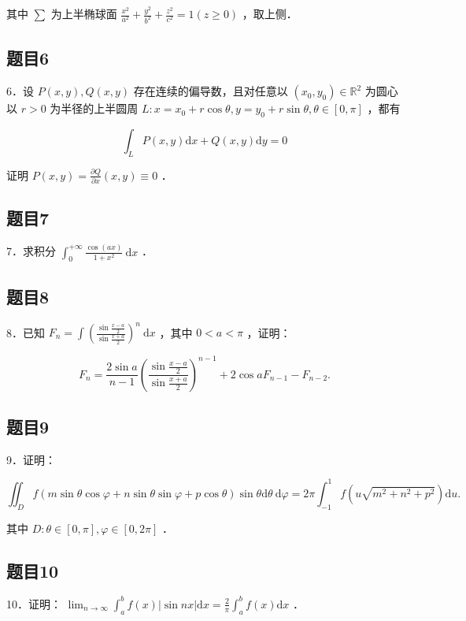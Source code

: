 \documentclass{article}
\begin{document}
其中 \(\sum\) 为上半椭球面 \(\frac{x^{2}}{a^{2}}+\frac{y^{2}}{b^{2}}+\frac{z^{2}}{c^{2}}=1(z \geq 0)\) ，取上侧．

\subsection{题目6}
6．设 \(P(x, y), Q(x, y)\) 存在连续的偏导数，且对任意以 \(\left(x_{0}, y_{0}\right) \in \mathbb{R}^{2}\) 为圆心以 \(r>0\) 为半径的上半圆周 \(L: x=x_{0}+r \cos \theta, y=y_{0}+r \sin \theta, \theta \in[0, \pi]\) ，都有

\[
\int_{L} P(x, y) \mathrm{d} x+Q(x, y) \mathrm{d} y=0
\]

证明 \(P(x, y)=\frac{\partial Q}{\partial x}(x, y) \equiv 0\) ．

\subsection{题目7}
7．求积分 \(\int_{0}^{+\infty} \frac{\cos (a x)}{1+x^{2}} \mathrm{~d} x\) ．

\subsection{题目8}
8．已知 \(F_{n}=\int\left(\frac{\sin \frac{x-a}{2}}{\sin \frac{x+a}{2}}\right)^{n} \mathrm{~d} x\) ，其中 \(0<a<\pi\) ，证明：

\[
F_{n}=\frac{2 \sin a}{n-1}\left(\frac{\sin \frac{x-a}{2}}{\sin \frac{x+a}{2}}\right)^{n-1}+2 \cos a F_{n-1}-F_{n-2} .
\]

\subsection{题目9}
9．证明：

\[
\iint_{D} f(m \sin \theta \cos \varphi+n \sin \theta \sin \varphi+p \cos \theta) \sin \theta \mathrm{d} \theta \mathrm{~d} \varphi=2 \pi \int_{-1}^{1} f\left(u \sqrt{m^{2}+n^{2}+p^{2}}\right) \mathrm{d} u .
\]

其中 \(D: \theta \in[0, \pi], \varphi \in[0,2 \pi]\) ．

\subsection{题目10}
10．证明： \(\lim _{n \rightarrow \infty} \int_{a}^{b} f(x)|\sin n x| \mathrm{d} x=\frac{2}{\pi} \int_{a}^{b} f(x) \mathrm{d} x\) ．
\end{document}

